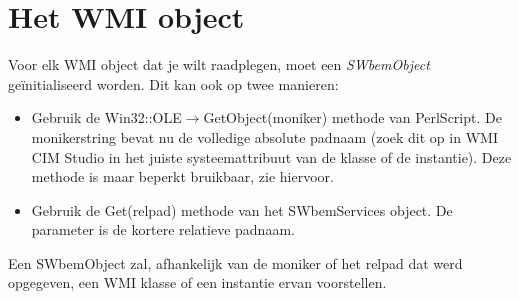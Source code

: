 \documentclass[11pt,a4paper]{report}
\begin{document}
\section{Het WMI object}
Voor elk WMI object dat je wilt raadplegen, moet een \textit{SWbemObject} geïnitialiseerd worden. Dit kan ook op twee manieren:
\begin{itemize}
	\item Gebruik de Win32::OLE$\rightarrow$GetObject(moniker) methode van PerlScript. De monikerstring bevat nu de volledige absolute padnaam (zoek dit op in WMI CIM Studio in het juiste systeemattribuut van de klasse of de instantie). Deze methode is maar beperkt bruikbaar, zie hiervoor.
	\item Gebruik de Get(relpad) methode van het SWbemServices object. De parameter is de kortere relatieve padnaam.
\end{itemize}
Een SWbemObject zal, afhankelijk van de moniker of het relpad dat werd opgegeven, een WMI klasse of een instantie ervan voorstellen.
\end{document}
